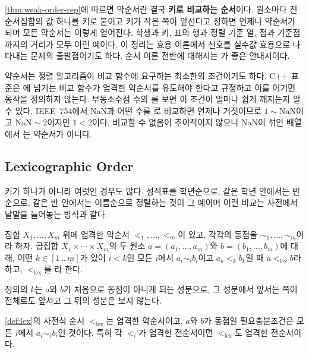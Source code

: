\cref{thm:weak-order-rep}에 따르면 약순서란 결국 \textbf{키로 비교하는 순서}이다. 원소마다 전순서집합의 값 하나를 키로 붙이고 키가 작은 쪽이 앞선다고 정하면 언제나 약순서가 되며 모든 약순서는 이렇게 얻어진다. 학생과 키, 표의 행과 정렬 기준 열, 점과 기준점까지의 거리가 모두 이런 예이다. 이 정리는 효용 이론에서 선호를 실수값 효용으로 나타내는 문제의 출발점이기도 하다\cite{fishburn1970utility}. 순서 이론 전반에 대해서는 \cite{davey2002order}가 좋은 안내서이다.

약순서는 정렬 알고리즘이 비교 함수에 요구하는 최소한의 조건이기도 하다. C++ 표준은 에 넘기는 비교 함수가 엄격한 약순서를 유도해야 한다고 규정하고 이를 어기면 동작을 정의하지 않는다\cite{iso14882-2020}. 부동소수점 수의 \code{<}를 보면 이 조건이 얼마나 쉽게 깨지는지 알 수 있다. IEEE~754에서 NaN과 어떤 수를 \code{<}로 비교하면 언제나 거짓이므로 $1\sim\text{NaN}$이고 $\text{NaN}\sim2$이지만 $1<2$이다. 비교할 수 없음이 추이적이지 않으니 NaN이 섞인 배열에서 \code{<}는 약순서가 아니다.

\subsection{Lexicographic Order}

키가 하나가 아니라 여럿인 경우도 많다. 성적표를 학년순으로, 같은 학년 안에서는 반 순으로, 같은 반 안에서는 이름순으로 정렬하는 것이 그 예이며 이런 비교는 사전에서 낱말을 늘어놓는 방식과 같다.

\begin{definition}[사전식 순서]
\label{def:lex}
집합 $X_1,\dots,X_m$ 위에 엄격한 약순서 $<_1,\dots,<_m$이 있고, 각각의 동점을 $\sim_1,\dots,\sim_m$이라 하자. 곱집합 $X_1\times\cdots\times X_m$의 두 원소 $a=(a_1,\dots,a_m)$와 $b=(b_1,\dots,b_m)$에 대해, 어떤 $k\in[1\,..\,m]$가 있어 $i<k$인 모든 $i$에서 $a_i\sim_i b_i$이고 $a_k<_k b_k$일 때 $a<_{\mathrm{lex}}b$라 하고, $<_{\mathrm{lex}}$를 라 한다.
\end{definition}

정의의 $k$는 $a$와 $b$가 처음으로 동점이 아니게 되는 성분으로, 그 성분에서 앞서는 쪽이 전체로도 앞서고 그 뒤의 성분은 보지 않는다.

\begin{theorem}
\label{thm:lex}
\cref{def:lex}의 사전식 순서 $<_{\mathrm{lex}}$는 엄격한 약순서이고, $a$와 $b$가 동점일 필요충분조건은 모든 $i$에서 $a_i\sim_i b_i$인 것이다. 특히 각 $<_i$가 엄격한 전순서이면 $<_{\mathrm{lex}}$도 엄격한 전순서이다.
\end{theorem}

